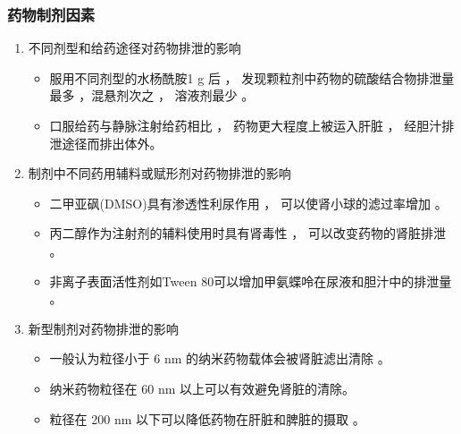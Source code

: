 \documentclass[dvipsnames, svgnames, x11names]{beamer}
\begin{document}
\begin{frame}
    \frametitle{药物制剂因素}
    \begin{enumerate}
      \item 不同剂型和给药途径对药物排泄的影响
        \begin{itemize}
          \item 服用不同剂型的水杨酰胺1 g 后 ， 发现颗粒剂中药物的硫酸结合物排泄量最多 ，混悬剂次之 ， 溶液剂最少 。
          \item 口服给药与静脉注射给药相比 ， 药物更大程度上被运入肝脏 ， 经胆汁排泄途径而排出体外。
        \end{itemize}
      \item 制剂中不同药用辅料或赋形剂对药物排泄的影响
        \begin{itemize}
          \item 二甲亚砜(DMSO)具有渗透性利尿作用 ， 可以使肾小球的滤过率增加 。 
          \item 丙二醇作为注射剂的辅料使用时具有肾毒性 ， 可以改变药物的肾脏排泄 。
          \item 非离子表面活性剂如Tween 80可以增加甲氨蝶呤在尿液和胆汁中的排泄量 。
        \end{itemize}
      \item 新型制剂对药物排泄的影响
        \begin{itemize}
          \item 一般认为粒径小于 6 nm 的纳米药物载体会被肾脏滤出清除 。
          \item 纳米药物粒径在 60 nm 以上可以有效避免肾脏的清除。
          \item 粒径在 200 nm 以下可以降低药物在肝脏和脾脏的摄取 。
        \end{itemize}
    \end{enumerate}
\end{frame}
\end{document}
